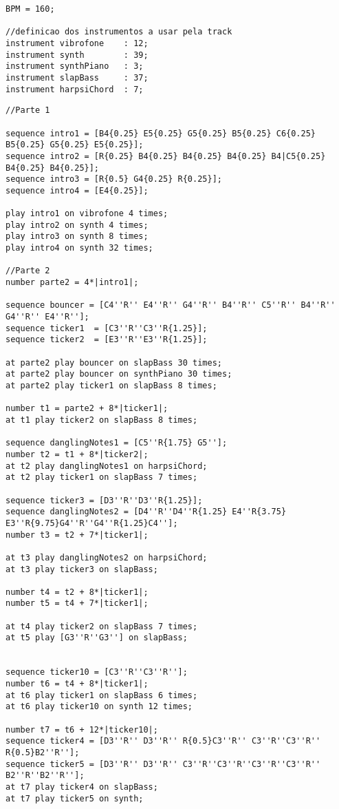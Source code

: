 \documentclass{article}
\begin{document}
\begin{lstlisting}[caption=StrangerThings.aux]
BPM = 160;

//definicao dos instrumentos a usar pela track
instrument vibrofone    : 12;
instrument synth        : 39;
instrument synthPiano   : 3; 
instrument slapBass	    : 37;
instrument harpsiChord	: 7;

\end{lstlisting}

\begin{lstlisting}[caption=StrangerThings.mux]
//Parte 1

sequence intro1 = [B4{0.25} E5{0.25} G5{0.25} B5{0.25} C6{0.25} B5{0.25} G5{0.25} E5{0.25}];
sequence intro2 = [R{0.25} B4{0.25} B4{0.25} B4{0.25} B4|C5{0.25} B4{0.25} B4{0.25}];
sequence intro3 = [R{0.5} G4{0.25} R{0.25}];
sequence intro4 = [E4{0.25}];

play intro1 on vibrofone 4 times;
play intro2 on synth 4 times;
play intro3 on synth 8 times;
play intro4 on synth 32 times;

//Parte 2
number parte2 = 4*|intro1|;

sequence bouncer = [C4''R'' E4''R'' G4''R'' B4''R'' C5''R'' B4''R'' G4''R'' E4''R''];
sequence ticker1  = [C3''R''C3''R{1.25}];
sequence ticker2  = [E3''R''E3''R{1.25}];

at parte2 play bouncer on slapBass 30 times;
at parte2 play bouncer on synthPiano 30 times;
at parte2 play ticker1 on slapBass 8 times;

number t1 = parte2 + 8*|ticker1|;
at t1 play ticker2 on slapBass 8 times;

sequence danglingNotes1 = [C5''R{1.75} G5''];
number t2 = t1 + 8*|ticker2|;
at t2 play danglingNotes1 on harpsiChord;
at t2 play ticker1 on slapBass 7 times;

sequence ticker3 = [D3''R''D3''R{1.25}];
sequence danglingNotes2 = [D4''R''D4''R{1.25} E4''R{3.75} E3''R{9.75}G4''R''G4''R{1.25}C4''];
number t3 = t2 + 7*|ticker1|;

at t3 play danglingNotes2 on harpsiChord;
at t3 play ticker3 on slapBass;

number t4 = t2 + 8*|ticker1|;
number t5 = t4 + 7*|ticker1|;

at t4 play ticker2 on slapBass 7 times;
at t5 play [G3''R''G3''] on slapBass;


sequence ticker10 = [C3''R''C3''R''];
number t6 = t4 + 8*|ticker1|;
at t6 play ticker1 on slapBass 6 times;
at t6 play ticker10 on synth 12 times;

number t7 = t6 + 12*|ticker10|;
sequence ticker4 = [D3''R'' D3''R'' R{0.5}C3''R'' C3''R''C3''R'' R{0.5}B2''R''];
sequence ticker5 = [D3''R'' D3''R'' C3''R''C3''R''C3''R''C3''R'' B2''R''B2''R''];
at t7 play ticker4 on slapBass;
at t7 play ticker5 on synth;



\end{lstlisting}
\end{document}
